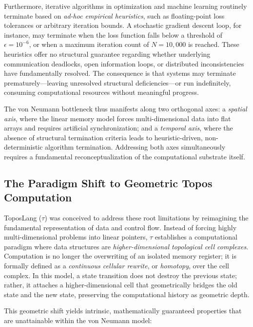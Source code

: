 \documentclass[manuscript, nonacm, review=false]{acmart}
\theoremstyle{definition}
\theoremstyle{plain}
\newcommand{\toposLang}{\ensuremath{\tau}\text{-Lang}}
\begin{document}
Furthermore, iterative algorithms in optimization and machine learning routinely terminate based on \emph{ad-hoc empirical heuristics}, such as floating-point loss tolerances or arbitrary iteration bounds. A stochastic gradient descent loop, for instance, may terminate when the loss function falls below a threshold of $\epsilon = 10^{-6}$, or when a maximum iteration count of $N = 10{,}000$ is reached. These heuristics offer no structural guarantee regarding whether underlying communication deadlocks, open information loops, or distributed inconsistencies have fundamentally resolved. The consequence is that systems may terminate prematurely---leaving unresolved structural deficiencies---or run indefinitely, consuming computational resources without meaningful progress.

The von Neumann bottleneck thus manifests along two orthogonal axes: a \emph{spatial axis}, where the linear memory model forces multi-dimensional data into flat arrays and requires artificial synchronization; and a \emph{temporal axis}, where the absence of structural termination criteria leads to heuristic-driven, non-deterministic algorithm termination. Addressing both axes simultaneously requires a fundamental reconceptualization of the computational substrate itself.


\subsection{The Paradigm Shift to Geometric Topos Computation}
\label{subsec:paradigm_shift}

ToposLang (\toposLang{}) was conceived to address these root limitations by reimagining the fundamental representation of data and control flow. Instead of forcing highly multi-dimensional problems into linear pointers, \toposLang{} establishes a computational paradigm where data structures are \emph{higher-dimensional topological cell complexes}. Computation is no longer the overwriting of an isolated memory register; it is formally defined as a \emph{continuous cellular rewrite}, or \emph{homotopy}, over the cell complex. In this model, a state transition does not destroy the previous state; rather, it attaches a higher-dimensional cell that geometrically bridges the old state and the new state, preserving the computational history as geometric depth.

This geometric shift yields intrinsic, mathematically guaranteed properties that are unattainable within the von Neumann model:
\end{document}
